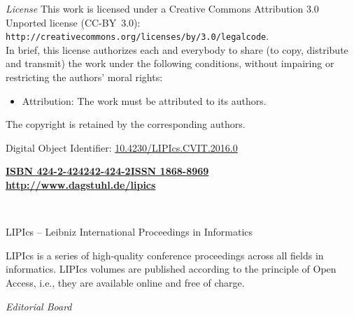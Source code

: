 \documentclass[a4paper,UKenglish]{lipicsmaster-v2016}
\newcommand{\VolumeISBN}{424-2-424242-424-2}
\begin{document}
\begin{publicationinfo}
\bigskip

\emph{License}\newline
This work is licensed under a Creative Commons Attribution 3.0 Unported license (CC-BY~3.0): \texttt{http://creativecommons.org/licenses/by/3.0/legalcode}.\\
In brief, this license authorizes each and everybody to share (to copy, distribute and transmit) the work under the following conditions, without impairing or restricting the authors' moral rights:
\begin{itemize}
\item Attribution: The work must be attributed to its authors.
\end{itemize}

\smallskip

The copyright is retained by the corresponding authors.

\bigskip
\bigskip
\bigskip
\bigskip

Digital Object Identifier: \href{http://dx.doi.org/10.4230/LIPIcs.CVIT.2016.0}{10.4230/LIPIcs.CVIT.2016.0}

\vfill
\textbf{\href{http://www.dagstuhl.de/dagpub/\VolumeISBN}{ISBN \VolumeISBN}}\qquad \qquad \textbf{\href{http://drops.dagstuhl.de/lipics}{ISSN 1868-8969}}  \hfill \textbf{\href{http://www.dagstuhl.de/lipics}{http://www.dagstuhl.de/lipics}}

  
\newpage

\ \\
\bigskip
\bigskip
\bigskip

{\Large LIPIcs -- Leibniz International Proceedings in Informatics}
 
\bigskip
 
LIPIcs is a series of high-quality conference proceedings across all fields in informatics. 
LIPIcs volumes are published according to the principle of Open Access, i.e., they are available online and free of charge. 
 
\bigskip
\bigskip
\bigskip
 
\emph{Editorial Board}


\end{publicationinfo}
\end{document}
